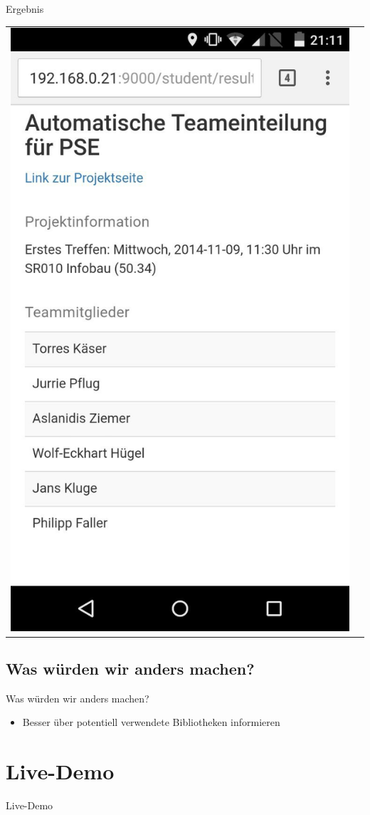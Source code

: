 \documentclass[18pt]{beamer}
\begin{document}
\begin{frame}{Ergebnis}
{{\begin{tabular}{lr}
	\includegraphics[height=0.7\paperheight]{bilder/android2Screenshot.png}	\\
	\end{tabular}
}
	}

\end{frame}

\subsection{Was würden wir anders machen?}
\begin{frame}{Was würden wir anders machen?}
	\begin{itemize}
		\item Besser über potentiell verwendete Bibliotheken informieren
	\end{itemize}
	
\end{frame}

\section{Live-Demo}
\begin{frame}
 \begin{center}
  \Huge Live-Demo
 \end{center}
\end{frame}
\end{document}
